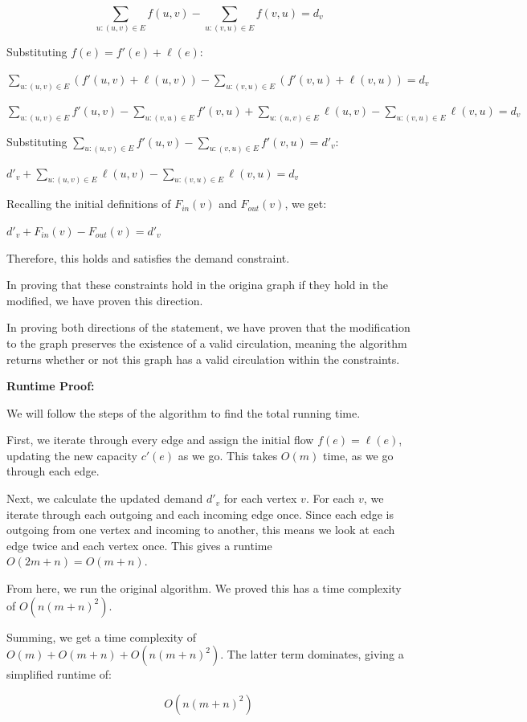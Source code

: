 \documentclass[11pt]{article}
\begin{document}
\begin{enumerate}
$$\sum_{u: (u, v) \in E} f(u, v) - \sum_{u: (v, u) \in E} f(v, u) = d_v$$

Substituting $f(e) = f'(e) + \ell(e)$:

$\sum_{u: (u, v) \in E} (f'(u, v) + \ell(u, v)) - \sum_{u: (v, u) \in E} (f'(v, u) + \ell(v, u)) = d_v$

$\sum_{u: (u, v) \in E} f'(u, v) - \sum_{u: (v, u) \in E} f'(v, u) + \sum_{u: (u, v) \in E} \ell(u, v) - \sum_{u: (v, u) \in E} \ell(v, u) = d_v$

Substituting $\sum_{u: (u, v) \in E} f'(u, v) - \sum_{u: (v, u) \in E} f'(v, u) = d'_v$:

$d'_v + \sum_{u: (u, v) \in E} \ell(u, v) - \sum_{u: (v, u) \in E} \ell(v, u) = d_v$

Recalling the initial definitions of $F_{in}(v)$ and $F_{out}(v)$, we get:

$d'_v + F_{in}(v) - F_{out}(v) = d'_v$

Therefore, this holds and satisfies the demand constraint. 

In proving that these constraints hold in the origina graph if they hold in the modified, we have proven this direction.

\medbreak

In proving both directions of the statement, we have proven that the modification to the graph preserves the existence of a valid circulation, 
meaning the algorithm returns whether or not this graph has a valid circulation within the constraints. 

\bigbreak

\textbf{Runtime Proof:}

We will follow the steps of the algorithm to find the total running time. 

First, we iterate through every edge and assign the initial flow $f(e) = \ell(e)$, updating the new capacity $c'(e)$ as we go. 
This takes $O(m)$ time, as we go through each edge. 

Next, we calculate the updated demand $d'_v$ for each vertex $v$. For each $v$, we iterate through each outgoing and each incoming edge once. 
Since each edge is outgoing from one vertex and incoming to another, this means we look at each edge twice and each vertex once. 
This gives a runtime $O(2m + n) = O(m + n)$.

From here, we run the original algorithm. We proved this has a time complexity of $O(n(m + n)^{2})$. 

Summing, we get a time complexity of $O(m) + O(m + n) + O(n(m + n)^{2})$. The latter term dominates, giving a simplified runtime of:

$$O(n(m + n)^{2})$$

\end{enumerate}
\end{document}
